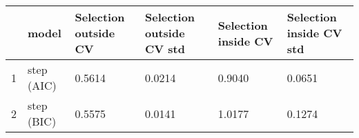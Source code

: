 \begin{tabular}{c|p{2cm}|p{2cm}|p{2cm}|p{2cm}|p{2cm}}
\toprule
{} &       model &  Selection outside CV &  Selection outside CV std &  Selection inside CV &  Selection inside CV std \\
\midrule
1 &  step (AIC) &                0.5614 &                    0.0214 &               0.9040 &                   0.0651 \\
2 &  step (BIC) &                0.5575 &                    0.0141 &               1.0177 &                   0.1274 \\
\bottomrule
\end{tabular}
